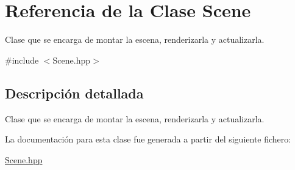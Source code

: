 \hypertarget{class_scene}{}\section{Referencia de la Clase Scene}
\label{class_scene}


Clase que se encarga de montar la escena, renderizarla y actualizarla.  




{\ttfamily \#include $<$Scene.\+hpp$>$}



\subsection{Descripción detallada}
Clase que se encarga de montar la escena, renderizarla y actualizarla. 

La documentación para esta clase fue generada a partir del siguiente fichero\+:\begin{DoxyCompactItemize}
\item 
\mbox{\hyperlink{_scene_8hpp}{Scene.\+hpp}}\end{DoxyCompactItemize}
